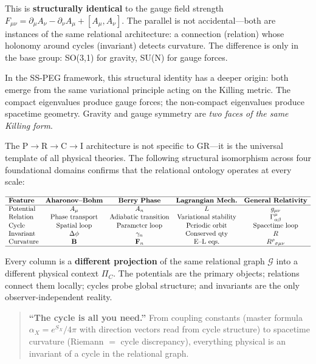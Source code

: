 This is \textbf{structurally identical} to the gauge field strength $F_{\mu\nu} = \partial_\mu A_\nu - \partial_\nu A_\mu + [A_\mu, A_\nu]$. The parallel is not accidental---both are instances of the same relational architecture: a connection (relation) whose holonomy around cycles (invariant) detects curvature. The difference is only in the base group: SO(3,1) for gravity, SU(N) for gauge forces.

In the SS-PEG framework, this structural identity has a deeper origin: both emerge from the same variational principle acting on the Killing metric. The compact eigenvalues produce gauge forces; the non-compact eigenvalues produce spacetime geometry. Gravity and gauge symmetry are \textit{two faces of the same Killing form}.

The P$\to$R$\to$C$\to$I architecture is not specific to GR---it is the universal template of all physical theories. The following structural isomorphism across four foundational domains confirms that the relational ontology operates at every scale:

\begin{equation}
\begin{array}{lcccc}
\hline
\textbf{Feature} & \textbf{Aharonov--Bohm} & \textbf{Berry Phase} & \textbf{Lagrangian Mech.} & \textbf{General Relativity} \\
\hline
\text{Potential} & A_\mu & A_n & L & g_{\mu\nu} \\
\text{Relation} & \text{Phase transport} & \text{Adiabatic transition} & \text{Variational stability} & \Gamma^\mu_{\alpha\beta} \\
\text{Cycle} & \text{Spatial loop} & \text{Parameter loop} & \text{Periodic orbit} & \text{Spacetime loop} \\
\text{Invariant} & \Delta\phi & \gamma_n & \text{Conserved qty} & R \\
\text{Curvature} & \mathbf{B} & \mathbf{F}_n & \text{E--L eqs.} & R^\rho{}_{\sigma\mu\nu} \\
\hline
\end{array}
\end{equation}

Every column is a \textbf{different projection} of the same relational graph $\mathcal{G}$ into a different physical context $\Pi_C$. The potentials are the primary objects; relations connect them locally; cycles probe global structure; and invariants are the only observer-independent reality.

\begin{quote}
\textbf{``The cycle is all you need.''} From coupling constants (master formula $\alpha_X = e^{S_X}/4\pi$ with direction vectors read from cycle structure) to spacetime curvature (Riemann $=$ cycle discrepancy), everything physical is an invariant of a cycle in the relational graph.
\end{quote}

